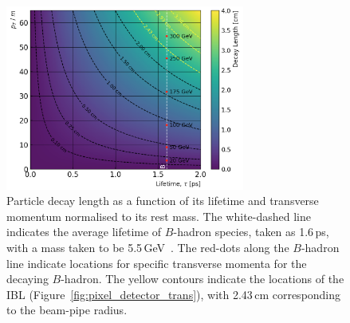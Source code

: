 \begin{figure}[!htb]
    \begin{center}
        \includegraphics[width=0.7\textwidth]{figures/bhadron_decay_length_ibl}
        \caption{
            Particle decay length as a function of its lifetime and transverse momentum normalised
            to its rest mass.
            The white-dashed line indicates the average lifetime of $B$-hadron species, taken
            as 1.6\,ps, with a mass taken to be 5.5\,GeV~\cite{PDGRef}.
            The red-dots along the $B$-hadron line indicate locations for specific transverse momenta
            for the decaying $B$-hadron.
            The yellow contours indicate the locations of the IBL (Figure~\ref{fig:pixel_detector_trans}),
            with 2.43\,cm corresponding to the beam-pipe radius.
        }
        \label{fig:bhadron_decay_length}
    \end{center}
\end{figure}

